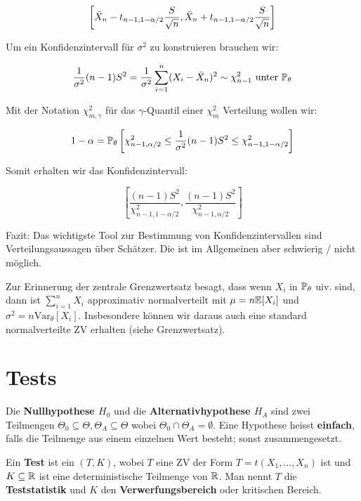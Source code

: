 $$\left[ \Bar{X}_n - t_{n-1, 1 - \alpha / 2} \frac{S}{\sqrt{n}},  \Bar{X}_n + t_{n-1, 1 - \alpha / 2} \frac{S}{\sqrt{n}} \right]$$

Um ein Konfidenzintervall für $\sigma^2$ zu konstruieren brauchen wir:

$$\frac{1}{\sigma^2} (n-1) S^2 = \frac{1}{\sigma^2} \sum\limits_{i=1}^n (X_i - \Bar{X}_n)^2 \sim \chi_{n-1}^2 \text{ unter } \mathbb{P}_\theta$$

Mit der Notation $\chi_{m, \gamma}^2$ für das $\gamma$-Quantil einer $\chi_m^2$ Verteilung wollen wir:

$$1 - \alpha = \mathbb{P}_\theta \left[ \chi_{n-1, \alpha/2}^2 \leq \frac{1}{\sigma^2} (n-1) S^2 \leq \chi_{n-1, 1- \alpha/2}^2\right]$$

Somit erhalten wir das Konfidenzintervall:

$$\left[ \frac{(n-1) S^2}{\chi_{n-1, 1-\alpha/2}^2} , \frac{(n-1) S^2}{\chi_{n-1, \alpha/2}^2} \right]$$

Fazit: Das wichtigste Tool zur Bestimmung von Konfidenzintervallen sind Verteilungsaussagen über Schätzer. Die ist im Allgemeinen aber schwierig / nicht möglich.



Zur Erinnerung der zentrale Grenzwertsatz besagt, dass wenn $X_i$ in $\mathbb{P}_\theta$ uiv. sind, dann ist $\sum_{i=1}^n X_i$ approximativ normalverteilt mit $\mu = n \mathbb{E}[X_i]$ und $\sigma^2 = n \text{Var}_\theta[X_i]$. Insbesondere können wir daraus auch eine standard normalverteilte ZV erhalten (siehe Grenzwertsatz).


\section{Tests}



\begin{tcolorbox}
    Die \textbf{Nullhypothese $H_0$} und die \textbf{Alternativhypothese $H_A$} sind zwei Teilmengen $\Theta_0 \subseteq \Theta, \Theta_A \subseteq \Theta$ wobei $\Theta_0 \cap \Theta_A = \emptyset$. Eine Hypothese heisst \textbf{einfach}, falls die Teilmenge aus einem einzelnen Wert besteht; sonst zusammengesetzt.
\end{tcolorbox}


\columnbreak



\begin{tcolorbox}
    Ein \textbf{Test} ist ein $(T, K)$, wobei $T$ eine ZV der Form $T = t(X_1,...,X_n)$ ist und $K \subseteq \mathbb{R}$ ist eine deterministische Teilmenge von $\mathbb{R}$. Man nennt $T$ die \textbf{Teststatistik} und $K$ den \textbf{Verwerfungsbereich} oder kritischen Bereich.
\end{tcolorbox}

